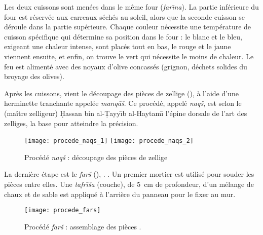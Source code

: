 Les deux cuissons sont menées dans le même four (\emph{far\={\i}na}). 
La partie inférieure du four est réservée aux carreaux séchés au 
soleil, alors que la seconde cuisson se déroule dans la partie 
supérieure. Chaque couleur nécessite une température de cuisson 
spécifique qui détermine sa position dans le four : le blanc et 
le bleu, exigeant une chaleur intense, sont placés tout en bas, le 
rouge et le jaune viennent ensuite, et enfin, on trouve le vert qui 
nécessite le moins de chaleur. Le feu est alimenté avec des noyaux 
d'olive concassés (grignon, déchets solides du broyage des olives).

Après les cuissons, vient le découpage des pièces de zellige 
(), à l'aide d'une herminette tranchante 
appelée \emph{manq\={a}\v{s}}. Ce procédé, appelé \emph{naq\v{s}}, 
est selon le \zlaygi (maître zelligeur) \d{H}assan bin 
al-\d{T}ayy\={\i}b al-Haytam\={\i} l'épine dorsale de l'art des 
zelliges, la base pour atteindre la précision.

\begin{figure}[htb]
  \texttt{[image: procede\_naqs\_1]}%
  \quad%
  \texttt{[image: procede\_naqs\_2]}%
  \caption[Procédé \emph{naq\v{s}} : découpage des pièces de zellige]
          {Procédé \emph{naq\v{s}} : découpage des pièces de zellige 
           \autocite{Castera_1996}}
  \label{fig:procede_naqs}
\end{figure}

La dernière étape est le \emph{far\v{s}} (), 
. \autocite{Damluji_1993a}.
Un premier mortier est utilisé pour souder les pièces entre elles. 
Une \emph{tafr\={\i}\v{s}a} (couche), de \SI{5}{\cm} de profondeur, 
d'un mélange de chaux et de sable est appliqué à l'arrière du panneau 
pour le fixer au mur.

\begin{figure}[htb]
  \texttt{[image: procede\_fars]}%
  \caption{Procédé \emph{far\v{s}} : assemblage des pièces 
           \autocite{Castera_1996}.}
  \label{fig:procede_fars}
\end{figure}


